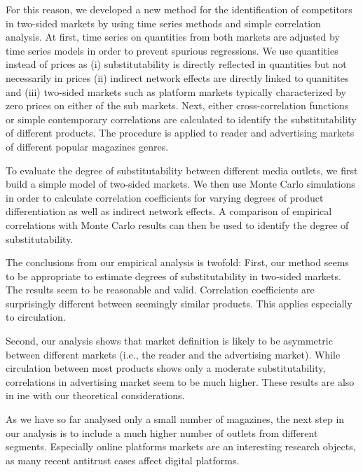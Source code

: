 \documentclass[12pt,a4paper,notitlepage]{article}
\begin{document}
For this reason, we developed a new method for the identification of competitors in two-sided markets by using time series methods and simple correlation analysis. At first, time series on quantities from both markets are adjusted by time series models in order to prevent spurious regressions. We use quantities instead of prices as (i) substitutability is directly reflected in quantities but not necessarily in prices (ii) indirect network effects are directly linked to quanitites  and (iii) two-sided markets such as platform markets typically characterized by zero prices on either of the sub markets. Next, either cross-correlation functions or simple contemporary correlations are calculated to identify the substitutability of different products. The procedure is applied to reader and advertising markets of different popular magazines genres. 

To evaluate the degree of substitutability between different media outlets, we first build a simple model of two-sided markets. We then use Monte Carlo simulations in order to calculate correlation coefficients for varying degrees of product differentiation as well as indirect network effects. A comparison of empirical correlations with Monte Carlo results can then be used to identify the degree of substitutability. 

The conclusions from our empirical analysis is twofold: First, our method seems to be appropriate to estimate degrees of substitutability in two-sided markets. The results seem to be reasonable and valid. Correlation coefficients are surprisingly different between seemingly similar products. This applies especially to circulation. 

Second, our analysis shows that market definition is likely to be asymmetric between different markets (i.e., the reader and the advertising market). While circulation between most products shows only a moderate substitutability, correlations in advertising market seem to be much higher. These results are also in ine with our theoretical considerations. 

As we have so far analysed only a small number of magazines, the next step in our analysis is to include a much higher number of outlets from different segments. Especially online platforms markets are an interesting research objects, as many recent antitrust cases affect digital platforms. 


\end{document}
